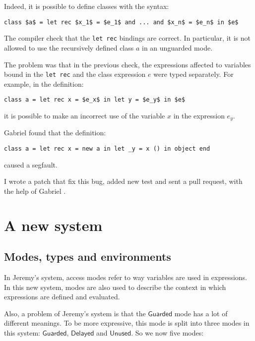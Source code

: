 \documentclass{article}
\newcommand{\Guarded}{\mathsf{Guarded}}
\newcommand{\Delayed}{\mathsf{Delayed}}
\newcommand{\Unused}{\mathsf{Unused}}
\begin{document}
Indeed, it is possible to define classes with the syntax:
\begin{lstlisting}[mathescape=true]
class $a$ = let rec $x_1$ = $e_1$ and ... and $x_n$ = $e_n$ in $e$
\end{lstlisting}
The compiler check that the \lstinline|let rec| bindings are correct. In
particular, it is not allowed to use the recursively defined class $a$ in an
unguarded mode.

The problem was that in the previous check, the expressions affected to
variables bound in the \lstinline|let rec| and the class expression $e$ were
typed separately. For example, in the definition:
\begin{lstlisting}[mathescape=true]
class a = let rec x = $e_x$ in let y = $e_y$ in $e$
\end{lstlisting}
it is possible to make an incorrect use of the variable $x$ in the expression
$e_y$.

Gabriel found that the definition:
\begin{lstlisting}
class a = let rec x = new a in let _y = x () in object end
\end{lstlisting}
caused a segfault.

I wrote a patch that fix this bug, added new test and sent a pull request,
with the help of Gabriel \cite{PullRequest}.


\section{A new system}


\subsection{Modes, types and environments}
In Jeremy's system, access modes refer to way variables are used in expressions.
In this new system, modes are also used to describe the context in which
expressions are defined and evaluated.

Also, a problem of Jeremy's system is that the $\Guarded$ mode has a lot of
different meanings. To be more expressive, this mode is split into three modes
in this system: $\Guarded$, $\Delayed$ and $\Unused$. So we now five modes:
\end{document}
